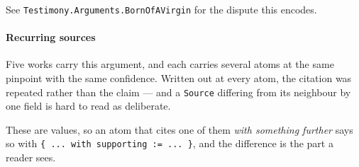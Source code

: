 \documentclass[11pt]{article}
\begin{document}
See \texttt{Testimony.Arguments.Born\allowbreak{}Of\allowbreak{}AVirgin} for the dispute this encodes.

\paragraph*{Recurring sources}
\leavevmode\par
Five works carry this argument, and each carries several atoms at the same pinpoint with the same confidence. Written out at every atom, the citation was repeated rather than the claim — and a \texttt{Source} differing from its neighbour by one field is hard to read as deliberate.

These are values, so an atom that cites one of them \emph{with something further} says so with \texttt{\{ ... with supporting := ... \}}, and the difference is the part a reader sees.
\end{document}
